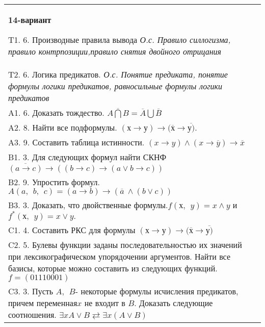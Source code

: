 \documentclass{article}
\begin{document}
\begin{tabular}{m{17cm}}
\textbf{14-вариант}
\newline

T1. 6. Производные правила вывода \emph{О.с. Правило силлогизма, правило контрпозиции,правило снятия двойного отрицания} \\
T2. 6. Логика предикатов. \emph{О.с. Понятие предиката, понятие формулы логики предикатов, равносильные формулы логики предикатов} \\
A1. 6. Доказать тождество. \(\overline{A\bigcap B} = \overline{A}\bigcup\overline{B}\) \\
A2. 8. Найти все подформулы. \((х \rightarrow у) \rightarrow (\overline{х} \rightarrow \overline{у)}\). \\
A3. 9. Составить таблица истинности. \((x \rightarrow y) \land (x \rightarrow \overline{y}) \rightarrow \overline{x}\) \\
B1. 3. Для следующих формул найти СКНФ \(\overline{(a \rightarrow c)} \rightarrow \left( (b \rightarrow c) \rightarrow (a \vee b \rightarrow c) \right)\) \\
B2. 9. Упростить формул. \(A(a,\ \ b,\ \ c) = (a \rightarrow b) \rightarrow (\overline{a}\  \land (b \vee c))\) \\
B3. 3. Доказать, что двойственные формулы.\(f(х,\ \ y) = x \land y\) и \(f^{*}(х,\ \ y) = x \vee y.\) \\
C1. 4. Составить РКС для формулы \((х \rightarrow у) \rightarrow (\overline{х} \rightarrow \overline{у)}\) \\
C2. 5. Булевы функции заданы последовательностью их значений при лексикографическом упорядочении аргументов. Найти все базисы, которые можно составить из следующих функций. \(f = (01110001)\) \\
C3. 3. Пусть \(A,\ \ B\)- некоторые формулы исчисления предикатов, причем переменная\(x\) не входит в \(B\). Доказать следующие соотношения. \(\exists xA \vee B \rightleftarrows \exists x(A \vee B)\) \\

\end{tabular}
\vspace{1cm}
\end{document}
